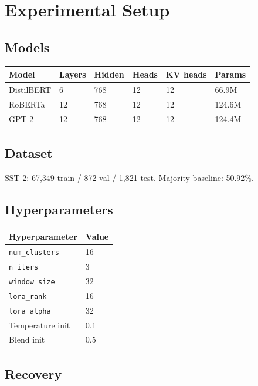 \section{Experimental Setup}

\subsection{Models}

\begin{table}[H]
\centering
\small
\begin{tabular}{llllll}
\toprule
\textbf{Model} & \textbf{Layers} & \textbf{Hidden} & \textbf{Heads} & \textbf{KV heads} & \textbf{Params} \\
\midrule
DistilBERT & 6 & 768 & 12 & 12 & 66.9M \\
RoBERTa & 12 & 768 & 12 & 12 & 124.6M \\
GPT-2 & 12 & 768 & 12 & 12 & 124.4M \\
\bottomrule
\end{tabular}
\end{table}

\subsection{Dataset}

SST-2: 67,349 train / 872 val / 1,821 test. Majority baseline: 50.92\%.

\subsection{Hyperparameters}

\begin{table}[H]
\centering
\small
\begin{tabular}{ll}
\toprule
\textbf{Hyperparameter} & \textbf{Value} \\
\midrule
\texttt{num\_clusters} & 16 \\
\texttt{n\_iters} & 3 \\
\texttt{window\_size} & 32 \\
\texttt{lora\_rank} & 16 \\
\texttt{lora\_alpha} & 32 \\
Temperature init & 0.1 \\
Blend init & 0.5 \\
\bottomrule
\end{tabular}
\end{table}

\subsection{Recovery}

